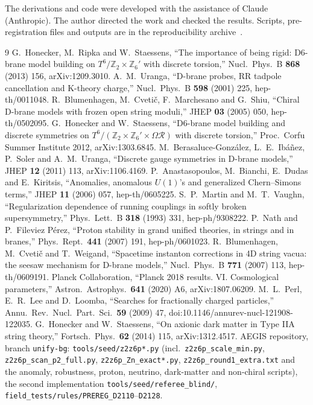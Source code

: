 \documentclass[aps,prd,twocolumn,superscriptaddress,nofootinbib,showkeys]{revtex4-2}
\begin{document}
\begin{acknowledgments}
The derivations and code were developed with the assistance of Claude (Anthropic). The author directed the work and checked the results. Scripts, pre-registration files and outputs are in the reproducibility archive~\cite{repo}.
\end{acknowledgments}
\begin{thebibliography}{9}
 G.~Honecker, M.~Ripka and W.~Staessens, ``The importance of being rigid: D6-brane model building on $T^6/\mathbb{Z}_2\times\mathbb{Z}_6'$ with discrete torsion,'' Nucl.\ Phys.\ B \textbf{868} (2013) 156, arXiv:1209.3010.
 A.~M.~Uranga, ``D-brane probes, RR tadpole cancellation and K-theory charge,'' Nucl.\ Phys.\ B \textbf{598} (2001) 225, hep-th/0011048.
 R.~Blumenhagen, M.~Cveti\v{c}, F.~Marchesano and G.~Shiu, ``Chiral D-brane models with frozen open string moduli,'' JHEP \textbf{03} (2005) 050, hep-th/0502095.
 G.~Honecker and W.~Staessens, ``D6-brane model building and discrete symmetries on $T^6/(\mathbb Z_2\times\mathbb Z_6'\times\Omega\mathcal R)$ with discrete torsion,'' Proc.\ Corfu Summer Institute 2012, arXiv:1303.6845.
 M.~Berasaluce-Gonz\'alez, L.~E.~Ib\'a\~nez, P.~Soler and A.~M.~Uranga, ``Discrete gauge symmetries in D-brane models,'' JHEP \textbf{12} (2011) 113, arXiv:1106.4169.
 P.~Anastasopoulos, M.~Bianchi, E.~Dudas and E.~Kiritsis, ``Anomalies, anomalous $U(1)$'s and generalized Chern--Simons terms,'' JHEP \textbf{11} (2006) 057, hep-th/0605225.
 S.~P.~Martin and M.~T.~Vaughn, ``Regularization dependence of running couplings in softly broken supersymmetry,'' Phys.\ Lett.\ B \textbf{318} (1993) 331, hep-ph/9308222.
 P.~Nath and P.~Fileviez P\'erez, ``Proton stability in grand unified theories, in strings and in branes,'' Phys.\ Rept.\ \textbf{441} (2007) 191, hep-ph/0601023.
 R.~Blumenhagen, M.~Cveti\v{c} and T.~Weigand, ``Spacetime instanton corrections in 4D string vacua: the seesaw mechanism for D-brane models,'' Nucl.\ Phys.\ B \textbf{771} (2007) 113, hep-th/0609191.
 Planck Collaboration, ``Planck 2018 results. VI. Cosmological parameters,'' Astron.\ Astrophys.\ \textbf{641} (2020) A6, arXiv:1807.06209.
 M.~L.~Perl, E.~R.~Lee and D.~Loomba, ``Searches for fractionally charged particles,'' Annu.\ Rev.\ Nucl.\ Part.\ Sci.\ \textbf{59} (2009) 47, doi:10.1146/annurev-nucl-121908-122035.
 G.~Honecker and W.~Staessens, ``On axionic dark matter in Type IIA string theory,'' Fortsch.\ Phys.\ \textbf{62} (2014) 115, arXiv:1312.4517.
 AEGIS repository, branch \texttt{unify-bg}: \texttt{tools/seed/z2z6p*.py} (incl.\ \texttt{z2z6p\_scale\_min.py}, \texttt{z2z6p\_scan\_p2\_full.py}, \texttt{z2z6p\_Zn\_exact*.py}, \texttt{z2z6p\_round1\_extra.txt} and the anomaly, robustness, proton, neutrino, dark-matter and non-chiral scripts), the second implementation \texttt{tools/seed/referee\_blind/}, \texttt{field\_tests/rules/PREREG\_D2110}--\texttt{D2128}.
\end{thebibliography}
\end{document}
